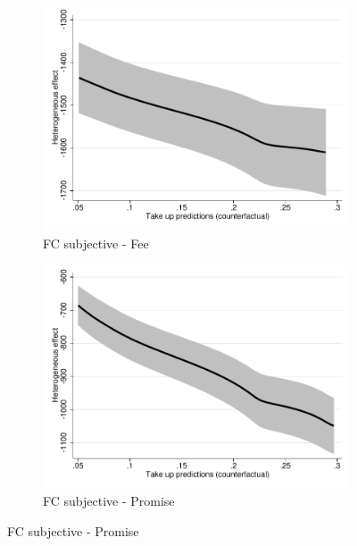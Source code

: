 \documentclass[11pt]{article}
\begin{document}
\begin{figure}[H]
\begin{center}
        \begin{subfigure}{0.45\textwidth}
        \caption{FC subjective - Fee}
        \centering
        \includegraphics[width=\textwidth]{Figuras/takeup_he_pro_2_pago_frec_vol_fee_fc_survey.pdf}
    \end{subfigure}
    \begin{subfigure}{0.45\textwidth}
        \caption{FC subjective - Promise}
        \centering
        \includegraphics[width=\textwidth]{Figuras/takeup_he_pro_3_pago_frec_vol_fee_fc_survey.pdf}
    \end{subfigure}
   

\end{center}
\end{figure}
\end{document}
